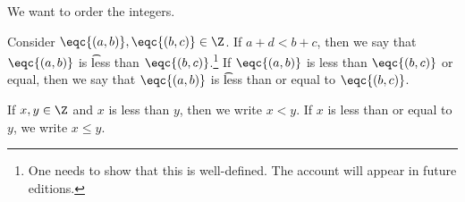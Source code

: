 

We want to order the integers.


Consider $\eqc{(a, b)}, \eqc{(b, c)} \in \Z$.
If $a + d < b + c$, then we say that
$\eqc{(a, b)}$ is \t{less than} $\eqc{(b, c)}$.\footnote{One needs to show that this is well-defined. The account will appear in future editions.}
If $\eqc{(a, b)}$ is less than $\eqc{(b, c)}$ or equal, then we say that $\eqc{(a, b)}$ is \t{less than or equal to} $\eqc{(b, c)}$.


If $x, y \in \Z$ and $x$ is less than $y$, then we write $x < y$.
If $x$ is less than or equal to $y$, we write $x \leq y$.

\blankpage
